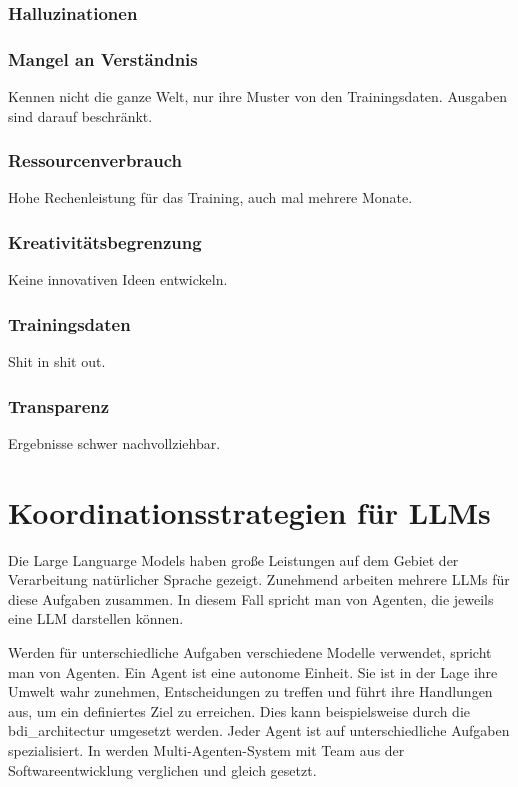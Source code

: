 \subsubsection{Halluzinationen}


\subsubsection{Mangel an Verständnis}
Kennen nicht die ganze Welt, nur ihre Muster von den Trainingsdaten. Ausgaben sind darauf beschränkt.


\subsubsection{Ressourcenverbrauch}
Hohe Rechenleistung für das Training, auch mal mehrere Monate.


\subsubsection{Kreativitätsbegrenzung}
Keine innovativen Ideen entwickeln.


\subsubsection{Trainingsdaten}
Shit in shit out.


\subsubsection{Transparenz}
Ergebnisse schwer nachvollziehbar.


\section{Koordinationsstrategien für LLMs}
Die Large Languarge Models haben große Leistungen auf dem Gebiet der Verarbeitung natürlicher Sprache gezeigt. Zunehmend arbeiten mehrere LLMs für diese Aufgaben zusammen. In diesem Fall spricht man von Agenten, die jeweils eine LLM darstellen können.\vspace{0.2cm}

Werden für unterschiedliche Aufgaben verschiedene Modelle verwendet, spricht man von Agenten. Ein Agent ist eine autonome Einheit. Sie ist in der Lage ihre Umwelt wahr zunehmen, Entscheidungen zu treffen und führt ihre Handlungen aus, um ein definiertes Ziel zu erreichen. Dies kann beispielsweise durch die \gls{bdi_architectur} umgesetzt werden. Jeder Agent ist auf unterschiedliche Aufgaben spezialisiert. In \cite{du-2024} werden Multi-Agenten-System mit Team aus der Softwareentwicklung verglichen und gleich gesetzt.\vspace{0.2cm}

